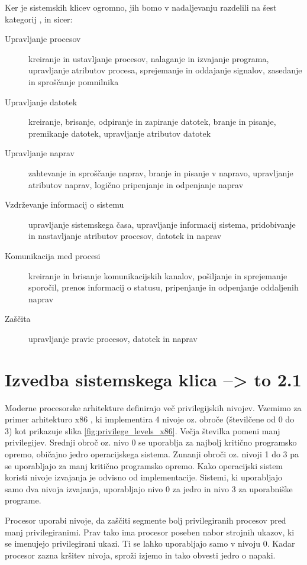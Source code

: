 \documentclass[a4paper,12pt,openright]{book}
\begin{document}
Ker je sistemskih klicev ogromno, jih bomo v nadaljevanju razdelili na šest kategorij \cite{Silberschatz_Galvin_Gagne_2018}, in sicer:
\begin{description}
	\item[Upravljanje procesov] kreiranje in ustavljanje procesov, nalaganje in izvajanje programa, upravljanje atributov procesa, sprejemanje in oddajanje signalov, zasedanje in sproščanje pomnilnika
	\item[Upravljanje datotek] kreiranje, brisanje, odpiranje in zapiranje datotek, branje in pisanje, premikanje datotek, upravljanje atributov datotek
	\item[Upravljanje naprav] zahtevanje in sproščanje naprav, branje in pisanje v napravo, upravljanje atributov naprav, logično pripenjanje in odpenjanje naprav
	\item[Vzdrževanje informacij o sistemu] upravljanje sistemskega časa, upravljanje informacij sistema, pridobivanje in nastavljanje atributov procesov, datotek in naprav
	\item[Komunikacija med procesi] kreiranje in brisanje komunikacijskih kanalov, pošiljanje in sprejemanje sporočil, prenos informacij o statusu, pripenjanje in odpenjanje oddaljenih naprav
	\item[Zaščita] upravljanje pravic procesov, datotek in naprav
\end{description}

\section{Izvedba sistemskega klica --> to 2.1} \label{sec:syscall_execution}

Moderne procesorske arhitekture definirajo več privilegijskih nivojev.
Vzemimo za primer arhitekturo x86 \cite{Intel_2024}, ki implementira 4 nivoje oz. obroče (številčene od 0 do 3) kot prikazuje slika \ref{fig:privilege_levels_x86}.
Večja številka pomeni manj privilegijev.
Srednji obroč oz. nivo 0 se uporablja za najbolj kritično programsko opremo, običajno jedro operacijskega sistema.
Zunanji obroči oz. nivoji 1 do 3 pa se uporabljajo za manj kritično programsko opremo.
Kako operacijski sistem koristi nivoje izvajanja je odvisno od implementacije.
Sistemi, ki uporabljajo samo dva nivoja izvajanja, uporabljajo nivo 0 za jedro in nivo 3 za uporabniške programe.

Procesor uporabi nivoje, da zaščiti segmente bolj privilegiranih procesov pred manj privilegiranimi.
Prav tako ima procesor poseben nabor strojnih ukazov, ki se imenujejo privilegirani ukazi.
Ti se lahko uporabljajo samo v nivoju 0.
Kadar procesor zazna kršitev nivoja, sproži izjemo in tako obvesti jedro o napaki.
\end{document}

